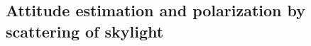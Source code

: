\subsection{Attitude estimation and polarization by scattering of skylight}
\label{subsec:ps-attitude}






